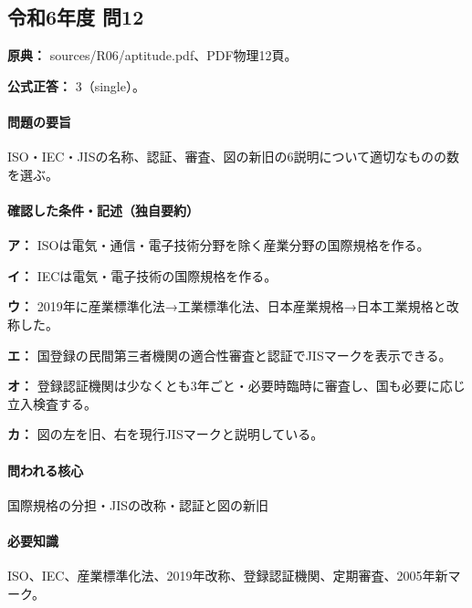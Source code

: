 \subsection{令和6年度 問12}
\label{q:r06-reg-apt-12}

\noindent\textbf{原典：} sources/R06/aptitude.pdf、PDF物理12頁。

\textbf{公式正答：} 3（single）。

\paragraph{問題の要旨} ISO・IEC・JISの名称、認証、審査、図の新旧の6説明について適切なものの数を選ぶ。

\paragraph{確認した条件・記述（独自要約）}\mbox{}\par

\noindent\textbf{ア：} ISOは電気・通信・電子技術分野を除く産業分野の国際規格を作る。\par

\noindent\textbf{イ：} IECは電気・電子技術の国際規格を作る。\par

\noindent\textbf{ウ：} 2019年に産業標準化法→工業標準化法、日本産業規格→日本工業規格と改称した。\par

\noindent\textbf{エ：} 国登録の民間第三者機関の適合性審査と認証でJISマークを表示できる。\par

\noindent\textbf{オ：} 登録認証機関は少なくとも3年ごと・必要時臨時に審査し、国も必要に応じ立入検査する。\par

\noindent\textbf{カ：} 図の左を旧、右を現行JISマークと説明している。\par

\paragraph{問われる核心} 国際規格の分担・JISの改称・認証と図の新旧

\paragraph{必要知識} ISO、IEC、産業標準化法、2019年改称、登録認証機関、定期審査、2005年新マーク。

